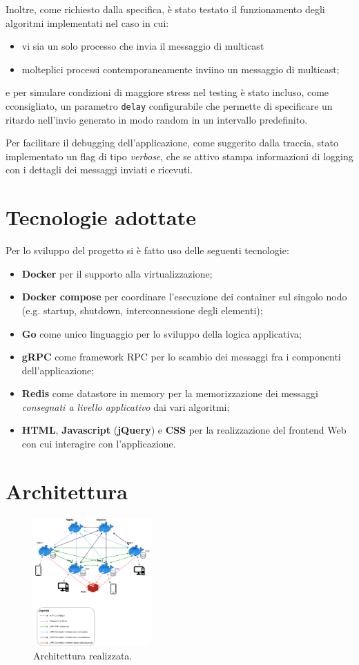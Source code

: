 \documentclass[conference]{IEEEtran}
\begin{document}
Inoltre, come richiesto dalla specifica, è stato testato il funzionamento degli algoritmi implementati nel caso in cui:
\begin{itemize}
\item vi sia un solo processo che invia il messaggio di multicast
\item molteplici processi contemporaneamente inviino un
messaggio di multicast;
\end{itemize}
e per simulare condizioni di maggiore stress nel testing è stato incluso, come cconsigliato, un parametro \texttt{delay} configurabile che permette di specificare un ritardo nell'invio generato in modo random in un intervallo predefinito.

Per facilitare il debugging dell'applicazione, come suggerito dalla traccia,  stato implementato un flag di tipo \textit{verbose}, che se attivo stampa informazioni di logging con i dettagli dei messaggi inviati e ricevuti.

\section{Tecnologie adottate}
Per lo sviluppo del progetto si è fatto uso delle seguenti tecnologie:
\begin{itemize}
\item \textbf{Docker} per il supporto alla virtualizzazione;
\item \textbf{Docker compose} per coordinare l'esecuzione dei container sul singolo nodo (e.g. startup, shutdown, interconnessione degli elementi);
\item \textbf{Go} come unico linguaggio per lo sviluppo della logica applicativa;
\item \textbf{gRPC} come framework RPC per lo scambio dei messaggi fra i componenti dell'applicazione;
\item \textbf{Redis} come datastore in memory per la memorizzazione dei messaggi \textit{consegnati a livello applicativo} dai vari algoritmi;
\item \textbf{HTML}, \textbf{Javascript} (\textbf{jQuery}) e \textbf{CSS} per la realizzazione del frontend Web con cui interagire con l'applicazione.
\end{itemize}

\section{Architettura}
\begin{figure}[htbp]
\centerline{\includegraphics[width=0.4\textwidth]{figs/architecture.png}}
\caption{Architettura realizzata.}
\label{fig:architecture}
\end{figure}
\end{document}
